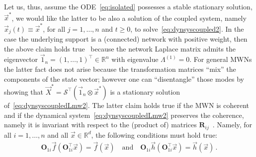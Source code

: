 \documentclass[aps,showpacs,preprintnumbers,amsmath,amssymb,twocolumn,superscriptaddress,floatfix,nofootinbib,10pt,pre]{revtex4-1}
\begin{document}
Let us, thus, assume the ODE~\eqref{eq:isolated} possesses a stable stationary solution, $\vec{x}^*$, we would like the latter to be also a solution of the coupled system, namely $\vec{x}_j(t)\equiv\vec{x}^*$, for all $j=1,\dots, n$ and $t\geq 0$, to solve~\eqref{eq:dynsyscoupled2}. In the case the underlying support is a (connected) network with positive weight, then the above claim holds true~\cite{fujisaka1983stability,Pecora_etal97,pecora1998master} because the network Laplace matrix admits the eigenvector $\vec{1}_n=(1,\dots,1)^\top\in\mathbb{R}^n$ with eigenvalue $\Lambda^{(1)}=0$. For general MWNs the latter fact does not arise because the transformation matrices ``mix'' the components of the state vector; however one can ``disentangle'' those modes by showing that $\vec{X}^*=\mathcal{S}^\top(\vec{1}_n\otimes \vec{x}^*)$ is a stationary solution of~\eqref{eq:dynsyscoupledLmw2}. The latter claim holds true if the MWN is coherent~\cite{tian2025matrix,gallo2025global} and if the dynamical system~\eqref{eq:dynsyscoupledLmw2} preserves the coherence, namely it is invariant with respect to the (product of) matrices $\mathbf{R}_{ij}$~\cite{gallo2025global}. Namely, for all $i=1,\dots,n$ and all $\vec{x}\in\mathbb{R}^d$, the following conditions must hold true:
\begin{align}
\label{eq:condfO}
 \mathbf{O}_{1i}\vec{f}(\mathbf{O}_{1i}^\top \vec{x}) = \vec{f}(\vec{x})\quad\text{and}\quad \mathbf{O}_{1i}\vec{h}(\mathbf{O}_{1i}^\top \vec{x}) = \vec{h}(\vec{x}) \, .
\end{align}
\end{document}
